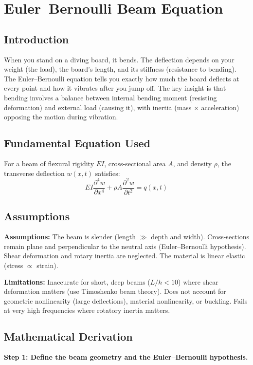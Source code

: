 \chapter{Euler--Bernoulli Beam Equation}

\section*{Introduction}

When you stand on a diving board, it bends. The deflection depends on your weight (the load), the board's length, and its stiffness (resistance to bending). The Euler--Bernoulli equation tells you exactly how much the board deflects at every point and how it vibrates after you jump off. The key insight is that bending involves a balance between internal bending moment (resisting deformation) and external load (causing it), with inertia (mass $\times$ acceleration) opposing the motion during vibration.
\section*{Fundamental Equation Used}

For a beam of flexural rigidity $EI$, cross-sectional area $A$, and density $\rho$, the transverse deflection $w(x,t)$ satisfies:
\[
EI\frac{\partial^4 w}{\partial x^4} + \rho A \frac{\partial^2 w}{\partial t^2} = q(x,t)
\]
\section*{Assumptions}

\textbf{Assumptions:} The beam is slender (length $\gg$ depth and width). Cross-sections remain plane and perpendicular to the neutral axis (Euler--Bernoulli hypothesis). Shear deformation and rotary inertia are neglected. The material is linear elastic (stress $\propto$ strain).


\textbf{Limitations:} Inaccurate for short, deep beams ($L/h < 10$) where shear deformation matters (use Timoshenko beam theory). Does not account for geometric nonlinearity (large deflections), material nonlinearity, or buckling. Fails at very high frequencies where rotatory inertia matters.


\section*{Mathematical Derivation}

\textbf{Step 1: Define the beam geometry and the Euler--Bernoulli hypothesis.}

